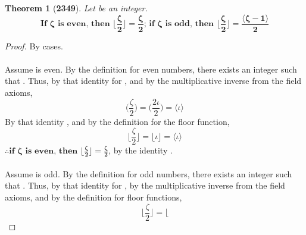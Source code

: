 \documentclass[preview]{standalone}
\newtheorem{theorem}{Theorem}
\begin{document}
\begin{theorem}[\textbf{2349}]
    Let \bm{$\zeta$} be an integer. 
    \begin{equation*}
        \textbf{If } \bm{\zeta} \textbf{ is even, then } 
        \bm{
            \bigg \lfloor \frac{\zeta}{2} \bigg \rfloor
                = 
            \frac{\zeta}{2}
        }
        \textbf{; if } \bm{\zeta} \textbf{ is odd, then } 
        \bm{
            \bigg \lfloor \frac{\zeta}{2} \bigg \rfloor 
                = 
            \frac{ \big \langle \zeta - 1 \big \rangle }{2}
        }
    \end{equation*}
\end{theorem}

\begin{proof}
    By cases. 
    \\ \\
     Assume \bm{$\zeta$} is even.
    By the definition for even numbers,
    there exists an integer \bm{$\iota$} such that 
    \bm{$\zeta = 2 \iota$}. 
    Thus, by that identity for \bm{$\zeta$}, 
    and by the multiplicative inverse from the field axioms,
    \begin{equation*}
        \bigg( \frac{\zeta}{2} \bigg)
            = 
        \bigg( \frac{2 \iota}{2} \bigg)
            = 
        \Big \langle \iota \Big \rangle
    \end{equation*}
    By that identity \bm{$\iota$}, 
    and by the definition for the floor function,
    \begin{equation*}
        \Big \lfloor \frac{\zeta}{2} \Big \rfloor
            =
        \Big \lfloor \iota \Big \rfloor 
            = 
        \Big \langle \iota \Big \rangle
    \end{equation*}
    $\therefore \textbf{if } \bm{\zeta} \textbf{ is even, then } 
        \bm{
            \Big \lfloor \frac{\zeta}{2} \Big \rfloor
                = 
            \frac{\zeta}{2}
    }$, 
    by the identity \bm{$\iota$}.
    \\ \\
     Assume \bm{$\zeta$} is odd. 
    By the definition for odd numbers,
    there exists an integer \bm{$\iota$} such that 
    .
    Thus, by that identity for \bm{$\zeta$}, 
    by the multiplicative inverse from the field axioms,
    and by the definition for floor functions,
    \begin{equation*}
        \bigg \lfloor 
            \frac{\zeta}{2}
        \bigg \rfloor 
            = 
        \bigg \lfloor 

\end{equation*}
\end{proof}
\end{document}
